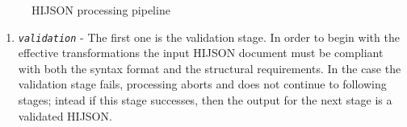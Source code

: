 \begin{figure}[!htbp]
\centering
{}
\caption{HIJSON processing pipeline}
\label{fig:pipeline}
\end{figure}

\begin{enumerate}
\def\labelenumi{\arabic{enumi}.}
\itemsep1pt\parskip0pt
\item
 \textit{\texttt{validation}} - The first one is the validation stage. In
  order to begin with the effective transformations the input HIJSON  document
  must be compliant with both the syntax format and the structural requirements.   In the
  case the validation stage fails, processing aborts and does not continue to
  following stages; intead if this stage successes, then the output for the next stage is a
  validated  HIJSON.


\end{enumerate}
